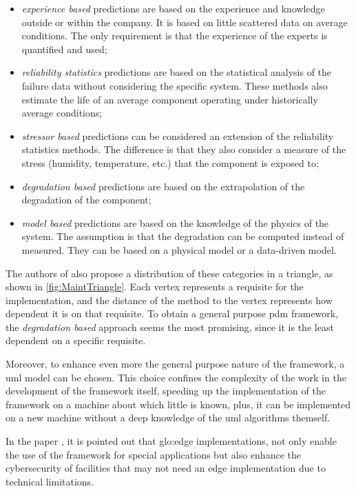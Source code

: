 \begin{itemize}
    \item \emph{experience based} predictions are based on the experience and knowledge outside or within the company. It is based on little scattered data on average conditions. The only  requirement is that the experience of the experts is quantified and used;
    \item \emph{reliability statistics} predictions are based on the statistical analysis of the failure data without considering the specific system. These methods also estimate the life
    of an average component operating under historically average conditions;
    \item \emph{stressor based} predictions can be considered an extension of the reliability statistics methods. The difference is that they also consider a measure of the stress (humidity, temperature, etc.) that the component is exposed to;
    \item \emph{degradation based} predictions are based on the extrapolation of the degradation of the component;
    \item \emph{model based} predictions are based on the knowledge of the physics of the system. The assumption is that the degradation can be computed instead of measured. They can be based on a physical model or a data-driven model.
\end{itemize}


The authors of \cite{Maintenance_cat} also propose a distribution of these categories in a triangle, as shown in \autoref{fig:MaintTriangle}. Each vertex represents a requisite for the implementation, and the distance of the method to the vertex represents how dependent it is on that requisite. To obtain a general purpose \gls{pdm} framework, the \emph{degradation based} approach seems the most promising, since it is the least dependent on a specific requisite.

Moreover, to enhance even more the general purpose nature of the framework, a \gls{uml} model can be chosen. This choice confines the complexity of the work in the development of the framework itself, speeding up the implementation of the framework on a machine about which little is known, plus, it can be implemented on a new machine without a deep knowledge of the \gls{uml} algorithms themself.

In the paper \cite{GridPredictMaintenance}, it is pointed out that \gls{glo:edge} implementations, not only enable the use of the framework for special applications but also enhance the cybersecurity of facilities that may not need an edge implementation due to technical limitations.